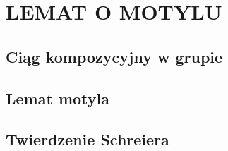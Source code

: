 \section{LEMAT O MOTYLU}

\subsection{Ciąg kompozycyjny w grupie}

\subsection{Lemat motyla}

\subsection{Twierdzenie Schreiera}